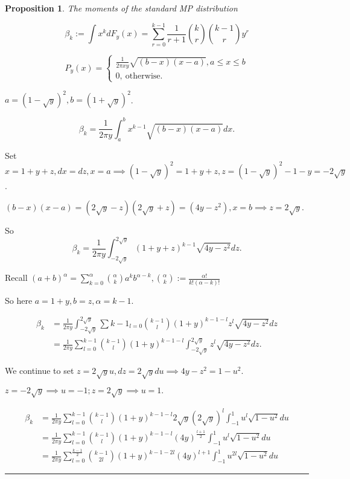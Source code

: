 \documentclass[twoside]{article}
\newtheorem{proposition}[theorem]{Proposition}
\newenvironment{proof}{{\bf Proof:}}{\hfill\rule{2mm}{2mm}}
\begin{document}
\begin{proposition}
	The moments of the standard MP distribution
	
	$$\beta_k:=\int x^kdF_y(x)=\sum^{k-1}_{r=0}\frac{1}{r+1}{k\choose r}{k-1 \choose r}y^r$$
\end{proposition}

\begin{proof}
	$$P_y(x)=\begin{cases}
		\frac{1}{2\pi xy}\sqrt{(b-x)(x-a)}, a\leq x\leq b\\
		0,\ \text{otherwise.}
	\end{cases}$$
	
	$a=(1-\sqrt{y})^2, b=(1+\sqrt{y})^2$.
	
	$$\beta_k=\frac{1}{2\pi y}\int^b_a x^{k-1}\sqrt{(b-x)(x-a)}dx.$$
	
	Set $x= 1+y+z, dx=dz, x=a\implies (1-\sqrt{y})^2=1+y+z, z=(1-\sqrt{y})^2-1-y=-2\sqrt{y}$.
	
	$(b-x)(x-a)=(2\sqrt{y}-z)(2\sqrt{y}+z)=(4y-z^2), x=b\implies z=2\sqrt{y}.$
	
	So 
	$$\beta_k=\frac{1}{2\pi y}\int^{2\sqrt{y}}_{-2\sqrt{y}}(1+y+z)^{k-1}\sqrt{4y-z^2}dz.$$
	
	Recall $(a+b)^\alpha=\sum^\alpha_{k=0}{\alpha\choose k}a^kb^{\alpha-k}, {\alpha\choose k}:=\frac{\alpha!}{k!(\alpha-k)!}$
	
	So here $a=1+y, b=z, \alpha=k-1.$
	
	\begin{equation}
		\begin{split}
			\beta_k&=\frac{1}{2\pi y}\int^{2\sqrt{y}}_{-2\sqrt{y}}\sum{k-1}_{l=0}{k-1\choose l}(1+y)^{k-1-l}z^{l}\sqrt{4y-z^2}dz\\
			&=\frac{1}{2\pi y}\sum^{k-1}_{l=0}{k-1\choose l}(1+y)^{k-1-l}\int^{2\sqrt{y}}_{-2\sqrt{y}}z^l\sqrt{4y-z^2}dz.
		\end{split}
	\end{equation}
	
	We continue to set $z=2\sqrt{y}u, dz=2\sqrt{y}du\implies 4y-z^2=1-u^2.$
	
	$z=-2\sqrt{y}\implies u=-1; z=2\sqrt{y}\implies u=1.$
	
	\begin{equation}
		\begin{split}
			\beta_k&=\frac{1}{2\pi y}\sum^{k-1}_{l=0}{k-1\choose l}(1+y)^{k-1-l}2\sqrt{y}(2\sqrt{y})^l\int^1_{-1}u^l\sqrt{1-u^2}du\\
			&=\frac{1}{2\pi y}\sum^{k-1}_{l=0}{k-1\choose l}(1+y)^{k-1-l}(4y)^{\frac{l+1}{2}}\int^1_{-1}u^l\sqrt{1-u^2}du\\
			&=\frac{1}{2\pi y}\sum^{\frac{k-1}{2}}_{l=0}{k-1\choose 2l}(1+y)^{k-1-2l}(4y)^{l+1}\int^1_{-1}u^{2l}\sqrt{1-u^2}du
		\end{split}
	\end{equation}
	

\end{proof}
\end{document}
